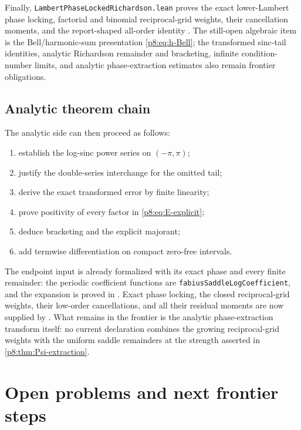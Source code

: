 \documentclass[11pt]{article}
\numberwithin{equation}{section}
\theoremstyle{definition}
\theoremstyle{remark}
\begin{document}
Finally, \texttt{LambertPhaseLockedRichardson.lean} proves the exact
lower-Lambert phase locking, factorial and binomial reciprocal-grid weights,
their cancellation moments, and the report-shaped all-order identity
.
The still-open algebraic item is the Bell/harmonic-sum presentation
\eqref{p8:eq:h-Bell}; the transformed sinc-tail identities, analytic Richardson
remainder and bracketing, infinite condition-number limits, and analytic
phase-extraction estimates also remain frontier obligations.

\subsection{Analytic theorem chain}

The analytic side can then proceed as follows:
\begin{enumerate}
\item establish the log-sinc power series on $(-\pi,\pi)$;
\item justify the double-series interchange for the omitted tail;
\item derive the exact transformed error by finite linearity;
\item prove positivity of every factor in \cref{p8:eq:E-explicit};
\item deduce bracketing and the explicit majorant;
\item add termwise differentiation on compact zero-free intervals.
\end{enumerate}

The endpoint input is already formalized with its exact phase and every finite
remainder: the periodic coefficient functions are
\texttt{fabiusSaddleLogCoefficient}, and the expansion is proved in
.  Exact phase locking, the closed
reciprocal-grid weights, their low-order cancellations, and all their residual
moments are now supplied by
.  What remains in the frontier is the
analytic phase-extraction transform itself: no current declaration combines
the growing reciprocal-grid weights with the uniform saddle remainders at the
strength asserted in \cref{p8:thm:Psi-extraction}.

\section{Open problems and next frontier steps}
\label{p8:sec:open}
\end{document}
